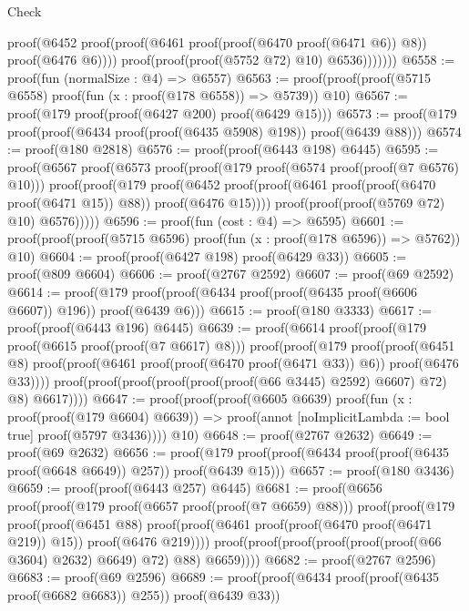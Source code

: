 \begin{lexlean}{Check}
\begin{coremodule}
                          proof(@6452
                              proof(proof(@6461 proof(proof(@6470 proof(@6471 @6)) @8))
                                  proof(@6476 @6))))
                        proof(proof(proof(@5752 @72) @10) @6536)))))))
@6558 := proof(fun (normalSize : @4) => @6557)
@6563 := proof(proof(proof(@5715 @6558) proof(fun (x : proof(@178 @6558)) => @5739)) @10)
@6567 := proof(@179 proof(proof(@6427 @200) proof(@6429 @15)))
@6573 := proof(@179 proof(proof(@6434 proof(proof(@6435 @5908) @198)) proof(@6439 @88)))
@6574 := proof(@180 @2818)
@6576 := proof(proof(@6443 @198) @6445)
@6595 := proof(@6567
      proof(@6573
          proof(proof(@179 proof(@6574 proof(proof(@7 @6576) @10)))
              proof(proof(@179
                    proof(@6452
                        proof(proof(@6461 proof(proof(@6470 proof(@6471 @15)) @88))
                            proof(@6476 @15))))
                  proof(proof(proof(@5769 @72) @10) @6576)))))
@6596 := proof(fun (cost : @4) => @6595)
@6601 := proof(proof(proof(@5715 @6596) proof(fun (x : proof(@178 @6596)) => @5762)) @10)
@6604 := proof(proof(@6427 @198) proof(@6429 @33))
@6605 := proof(@809 @6604)
@6606 := proof(@2767 @2592)
@6607 := proof(@69 @2592)
@6614 := proof(@179 proof(proof(@6434 proof(proof(@6435 proof(@6606 @6607)) @196)) proof(@6439 @6)))
@6615 := proof(@180 @3333)
@6617 := proof(proof(@6443 @196) @6445)
@6639 := proof(@6614
      proof(proof(@179 proof(@6615 proof(proof(@7 @6617) @8)))
          proof(proof(@179
                proof(proof(@6451 @8)
                    proof(proof(@6461 proof(proof(@6470 proof(@6471 @33)) @6)) proof(@6476 @33))))
              proof(proof(proof(proof(proof(proof(@66 @3445) @2592) @6607) @72) @8) @6617))))
@6647 := proof(proof(proof(@6605 @6639)
        proof(fun (x : proof(proof(@179 @6604) @6639)) =>
          proof(annot [noImplicitLambda := bool true] proof(@5797 @3436))))
      @10)
@6648 := proof(@2767 @2632)
@6649 := proof(@69 @2632)
@6656 := proof(@179
      proof(proof(@6434 proof(proof(@6435 proof(@6648 @6649)) @257)) proof(@6439 @15)))
@6657 := proof(@180 @3436)
@6659 := proof(proof(@6443 @257) @6445)
@6681 := proof(@6656
      proof(proof(@179 proof(@6657 proof(proof(@7 @6659) @88)))
          proof(proof(@179
                proof(proof(@6451 @88)
                    proof(proof(@6461 proof(proof(@6470 proof(@6471 @219)) @15))
                        proof(@6476 @219))))
              proof(proof(proof(proof(proof(proof(@66 @3604) @2632) @6649) @72) @88) @6659))))
@6682 := proof(@2767 @2596)
@6683 := proof(@69 @2596)
@6689 := proof(proof(@6434 proof(proof(@6435 proof(@6682 @6683)) @255)) proof(@6439 @33))

\end{coremodule}
\end{lexlean}
